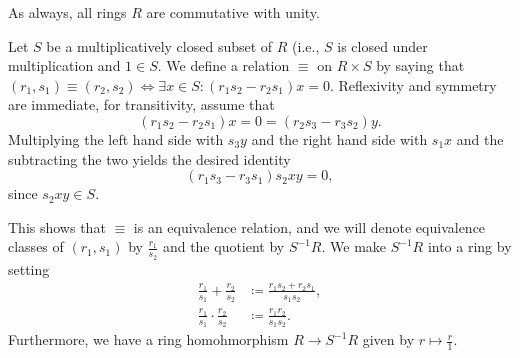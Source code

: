 As always, all rings $R$ are commutative with unity.

Let $S$ be a multiplicatively closed subset of $R$ (i.e.,  $S$ is closed under
multiplication and $1 \in S$. We define a relation $\equiv$ on $R\times S$ by saying
that $(r_1, s_1)\equiv (r_2, s_2)\iff \exists x \in S\colon (r_1s_2 - r_2s_1)x = 0$.
Reflexivity and symmetry are immediate, for transitivity, assume that
\[ (r_1s_2 - r_2s_1)x = 0 = (r_2s_3-r_3s_2)y. \]
Multiplying the left hand side with $s_3y$ and the right hand side with $s_1x$
and the subtracting the two yields the desired identity
\[ (r_1s_3 - r_3s_1)s_2xy = 0, \]
since $s_2xy \in S$.

This shows that $\equiv$ is an equivalence relation, and we will denote equivalence
classes of $(r_1, s_1)$ by $\frac{r_1}{s_2}$ and the quotient by
$S^{-1}R$. We make  $S^{-1}R$ into a ring by setting
\begin{align*}
	\frac{r_1}{s_1}+\frac{r_2}{s_2}&\coloneqq \frac{r_1s_2+r_2s_1}{s_1s_2},\\
	\frac{r_1}{s_1}\cdot\frac{r_2}{s_2}&\coloneqq \frac{r_1r_2}{s_1s_2}.
\end{align*}
Furthermore, we have a ring homohmorphism $R\to S^{-1}R$ given by $r\mapsto\frac{r}{1}$.
